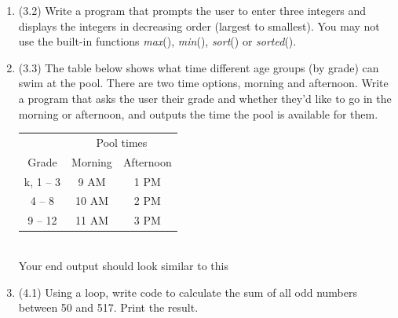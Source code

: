 \documentclass{article}
\begin{document}
\begin{enumerate}

\item (3.2)  
		Write a program that prompts the user to enter three integers and displays the integers 
		in decreasing order (largest to smallest).  You may not use the built-in functions 
		\textit{max}(), \textit{min}(), \textit{sort}() or \textit{sorted}().


\item (3.3)  
		The table below shows what time different age groups (by grade) can swim at the pool.  There 
		are two time options, morning and afternoon.  Write a program that asks the user their grade 
		and whether they'd like to go in the morning or afternoon, and outputs the time the pool is 
		available for them.

		\begin{minipage}{.45\textwidth}
		\begin{tabular}{c|cc}
						& \multicolumn{2}{c}{Pool times}\\
			Grade 		& Morning 	& Afternoon \\ \hline
			k, 1 -- 3 	& 9 AM 		& 1 PM\\
			4 -- 8 		& 10 AM 	& 2 PM\\
			9 -- 12 	& 11 AM 	& 3 PM \\
		\end{tabular}
		\end{minipage}
		\begin{minipage}{.45\textwidth}
			\ \\
			Your end output should look similar to this

		\end{minipage}











\item (4.1)  
		Using a loop, write code to calculate the sum of all odd numbers between 50 and 517. 
		Print the result.


\end{enumerate}
\pagebreak
\end{document}
